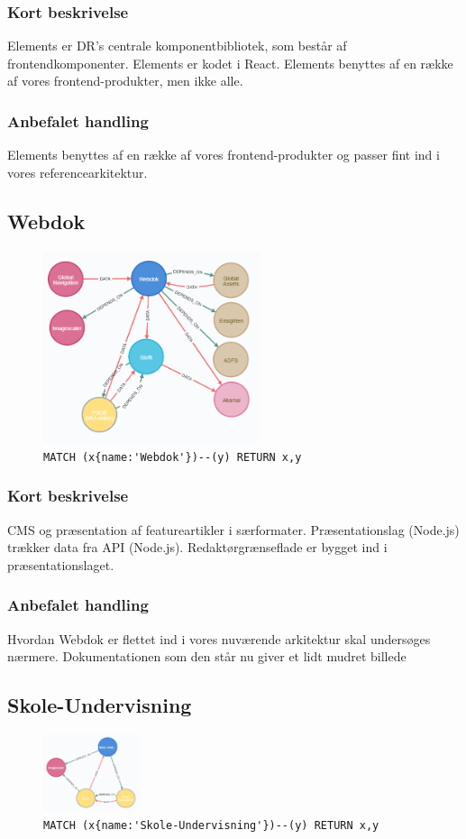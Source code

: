 \documentclass{article}
\begin{document}
\subsubsection*{Kort beskrivelse}
Elements er DR's centrale komponentbibliotek, som består af frontendkomponenter. Elements er kodet i React. Elements benyttes af en række af vores frontend-produkter, men ikke alle.
\subsubsection*{Anbefalet handling}
Elements benyttes af en række af vores frontend-produkter og passer fint ind i vores referencearkitektur.


\subsection{Webdok}
\begin{figure}[H]
\includegraphics[width=180pt]{Webdok.PNG}
\cprotect\caption{\verb|MATCH (x{name:'Webdok'})--(y) RETURN x,y|}
\end{figure}
\subsubsection*{Kort beskrivelse}
CMS og præsentation af featureartikler i særformater.	
Præsentationslag (Node.js) trækker data fra API (Node.js). Redaktørgrænseflade er bygget ind i præsentationslaget.
\subsubsection*{Anbefalet handling}
Hvordan Webdok er flettet ind i vores nuværende arkitektur skal undersøges nærmere. Dokumentationen som den står nu giver et lidt mudret billede



\subsection{Skole-Undervisning}
\begin{figure}[H]
\includegraphics[width=80pt]{Skole-Undervisning.PNG}
\cprotect\caption{\verb|MATCH (x{name:'Skole-Undervisning'})--(y) RETURN x,y|}
\end{figure}
\end{document}
